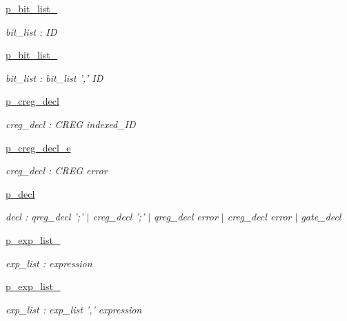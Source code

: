\begin{DoxyCompactItemize}
\hyperlink{namespaceqat_1_1interop_1_1qasm__parser_1_1OqasmParser_1_1p__bit__list__0}{p\-\_\-bit\-\_\-list\-\_}
\begin{DoxyCompactList}\small\item\em bit\-\_\-list \-: I\-D \end{DoxyCompactList}\item 
\hyperlink{namespaceqat_1_1interop_1_1qasm__parser_1_1OqasmParser_1_1p__bit__list__1}{p\-\_\-bit\-\_\-list\-\_}
\begin{DoxyCompactList}\small\item\em bit\-\_\-list \-: bit\-\_\-list ',' I\-D \end{DoxyCompactList}\item 
\hyperlink{namespaceqat_1_1interop_1_1qasm__parser_1_1OqasmParser_1_1p__creg__decl}{p\-\_\-creg\-\_\-decl}
\begin{DoxyCompactList}\small\item\em creg\-\_\-decl \-: C\-R\-E\-G indexed\-\_\-\-I\-D \end{DoxyCompactList}\item 
\hyperlink{namespaceqat_1_1interop_1_1qasm__parser_1_1OqasmParser_1_1p__creg__decl__e}{p\-\_\-creg\-\_\-decl\-\_\-e}
\begin{DoxyCompactList}\small\item\em creg\-\_\-decl \-: C\-R\-E\-G error \end{DoxyCompactList}\item 
\hyperlink{namespaceqat_1_1interop_1_1qasm__parser_1_1OqasmParser_1_1p__decl}{p\-\_\-decl}
\begin{DoxyCompactList}\small\item\em decl \-: qreg\-\_\-decl ';' $|$ creg\-\_\-decl ';' $|$ qreg\-\_\-decl error $|$ creg\-\_\-decl error $|$ gate\-\_\-decl \end{DoxyCompactList}\item 
\hyperlink{namespaceqat_1_1interop_1_1qasm__parser_1_1OqasmParser_1_1p__exp__list__0}{p\-\_\-exp\-\_\-list\-\_}
\begin{DoxyCompactList}\small\item\em exp\-\_\-list \-: expression \end{DoxyCompactList}\item 
\hyperlink{namespaceqat_1_1interop_1_1qasm__parser_1_1OqasmParser_1_1p__exp__list__1}{p\-\_\-exp\-\_\-list\-\_}
\begin{DoxyCompactList}\small\item\em exp\-\_\-list \-: exp\-\_\-list ',' expression \end{DoxyCompactList}\item 

\end{DoxyCompactItemize}
